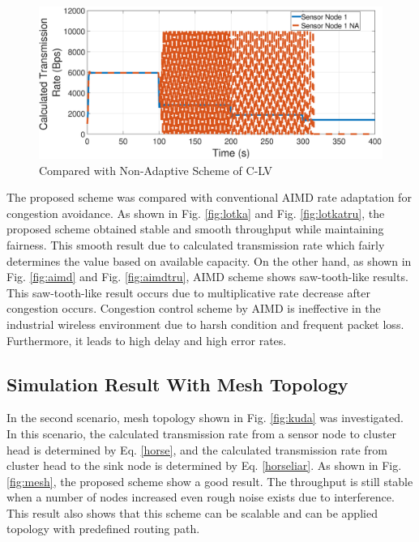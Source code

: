 \begin{figure}
	\centering
	\includegraphics[width=1\linewidth]{pics/comp1}
	\caption{Compared with Non-Adaptive Scheme of C-LV}
	\label{fig:comp1}
\end{figure}

The proposed scheme was compared with conventional AIMD rate adaptation for congestion avoidance. As shown in Fig. \ref{fig:lotka} and Fig. \ref{fig:lotkatru}, the proposed scheme obtained stable and smooth throughput while maintaining fairness. This smooth result due to calculated transmission rate which fairly determines the value based on available capacity. On the other hand, as shown in Fig. \ref{fig:aimd} and Fig. \ref{fig:aimdtru}, AIMD scheme shows saw-tooth-like results. This saw-tooth-like result occurs due to multiplicative rate decrease after congestion occurs. Congestion control scheme by AIMD is ineffective in the industrial wireless environment due to harsh condition and frequent packet loss. Furthermore, it leads to high delay and high error rates.

%

\subsection{Simulation Result With Mesh Topology}

In the second scenario, mesh topology shown in Fig. \ref{fig:kuda} was investigated. In this scenario, the calculated transmission rate from a sensor node to cluster head is determined by Eq. \ref{horse}, and the calculated transmission rate from cluster head to the sink node is determined by Eq. \ref{horseliar}.
As shown in Fig. \ref{fig:mesh}, the proposed scheme show a good result. The throughput is still stable when a number of nodes increased even rough noise exists due to interference. This result also shows that this scheme can be scalable and can be applied topology with predefined routing path.	

